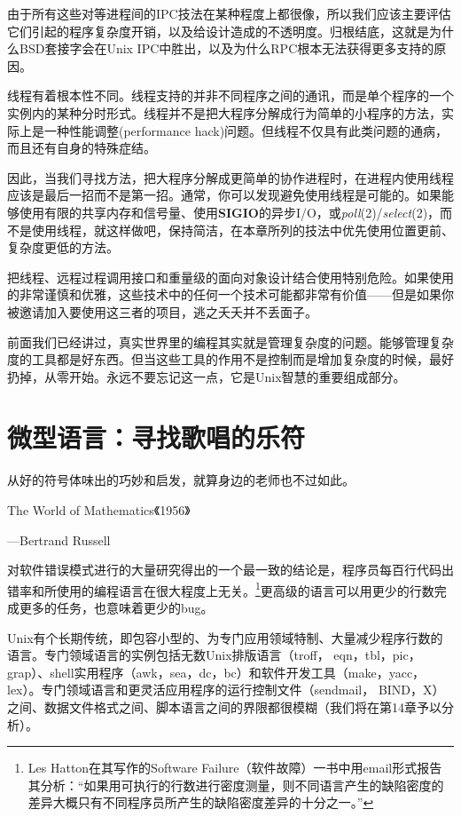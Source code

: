 \documentclass[12pt,oneside]{book}
\begin{document}
\begin{common-format}
由于所有这些对等进程间的IPC技法在某种程度上都很像，所以我们应该主要评估它们引起的程序复杂度开销，以及给设计造成的不透明度。归根结底，这就是为什么BSD套接字会在Unix IPC中胜出，以及为什么RPC根本无法获得更多支持的原因。

线程有着根本性不同。线程支持的并非不同程序之间的通讯，而是单个程序的一个实例内的某种分时形式。线程并不是把大程序分解成行为简单的小程序的方法，实际上是一种性能调整(performance hack)问题。但线程不仅具有此类问题的通病，而且还有自身的特殊症结。

因此，当我们寻找方法，把大程序分解成更简单的协作进程时，在进程内使用线程应该是最后一招而不是第一招。通常，你可以发现避免使用线程是可能的。如果能够使用有限的共享内存和信号量、使用\textbf{SIGIO}的异步I/O，或\textit{poll}(2)/\textit{select}(2)，而不是使用线程，就这样做吧，保持简洁，在本章所列的技法中优先使用位置更前、复杂度更低的方法。

把线程、远程过程调用接口和重量级的面向对象设计结合使用特别危险。如果使用的非常谨慎和优雅，这些技术中的任何一个技术可能都非常有价值——但是如果你被邀请加入要使用这三者的项目，逃之夭夭并不丢面子。

前面我们已经讲过，真实世界里的编程其实就是管理复杂度的问题。能够管理复杂度的工具都是好东西。但当这些工具的作用不是控制而是增加复杂度的时候，最好扔掉，从零开始。永远不要忘记这一点，它是Unix智慧的重要组成部分。


\chapter{微型语言：寻找歌唱的乐符}
\begin{flushright}
\begin{notecard}{23em}
从好的符号体味出的巧妙和启发，就算身边的老师也不过如此。
 
{\hfill  The World of Mathematics《1956》} 
 
{\hfill —Bertrand Russell}
\end{notecard}
\end{flushright}

对软件错误模式进行的大量研究得出的一个最一致的结论是，程序员每百行代码出错率和所使用的编程语言在很大程度上无关。\footnote{Les Hatton在其写作的Software Failure（软件故障）一书中用email形式报告其分析：“如果用可执行的行数进行密度测量，则不同语言产生的缺陷密度的差异大概只有不同程序员所产生的缺陷密度差异的十分之一。”}更高级的语言可以用更少的行数完成更多的任务，也意味着更少的bug。

Unix有个长期传统，即包容小型的、为专门应用领域特制、大量减少程序行数的语言。专门领域语言的实例包括无数Unix排版语言（troff， eqn，tbl，pic，grap）、shell实用程序（awk，sea，dc，bc）和软件开发工具（make，yacc，lex）。专门领域语言和更灵活应用程序的运行控制文件（sendmail， BIND，X）之间、数据文件格式之间、脚本语言之间的界限都很模糊（我们将在第14章予以分析）。


\end{common-format}
\end{document}
